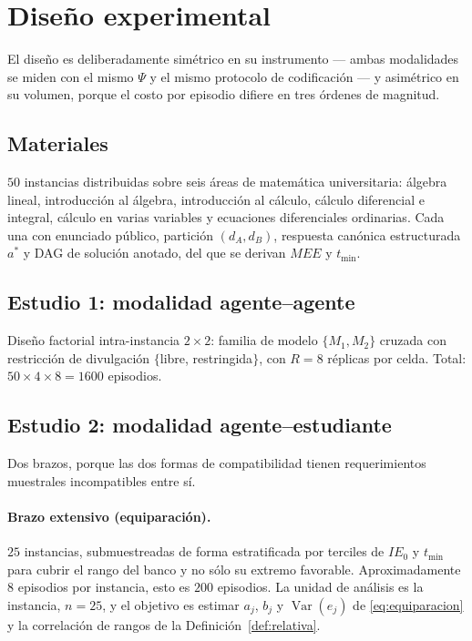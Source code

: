 \documentclass[11pt,a4paper]{article}
\theoremstyle{definition}
\theoremstyle{plain}
\theoremstyle{remark}
\DeclareMathOperator{\Var}{Var}
\begin{document}
\section{Diseño experimental}\label{sec:diseno}

El diseño es deliberadamente simétrico en su instrumento --- ambas modalidades se
miden con el mismo $\Psi$ y el mismo protocolo de codificación --- y asimétrico en
su volumen, porque el costo por episodio difiere en tres órdenes de magnitud.

\subsection{Materiales}

$50$ instancias distribuidas sobre seis áreas de matemática universitaria:
álgebra lineal, introducción al álgebra, introducción al cálculo, cálculo
diferencial e integral, cálculo en varias variables y ecuaciones diferenciales
ordinarias. Cada una con enunciado público, partición $(d_A,d_B)$, respuesta
canónica estructurada $a^\ast$ y DAG de solución anotado, del que se derivan
$MEE$ y $t_{\min}$.

\subsection{Estudio 1: modalidad agente--agente}

Diseño factorial intra-instancia $2\times2$: familia de modelo $\{M_1,M_2\}$
cruzada con restricción de divulgación $\{$libre, restringida$\}$, con $R=8$
réplicas por celda. Total: $50\times4\times8=1600$ episodios.

\subsection{Estudio 2: modalidad agente--estudiante}\label{sec:estudio2}

Dos brazos, porque las dos formas de compatibilidad tienen requerimientos
muestrales incompatibles entre sí.

\paragraph{Brazo extensivo (equiparación).} $25$ instancias, submuestreadas de
forma estratificada por terciles de $IE_0$ y $t_{\min}$ para cubrir el rango del
banco y no sólo su extremo favorable. Aproximadamente $8$ episodios por instancia,
esto es $200$ episodios. La unidad de análisis es la instancia, $n=25$, y el
objetivo es estimar $a_j$, $b_j$ y $\Var(e_j)$ de \eqref{eq:equiparacion} y la
correlación de rangos de la Definición~\ref{def:relativa}.
\end{document}
